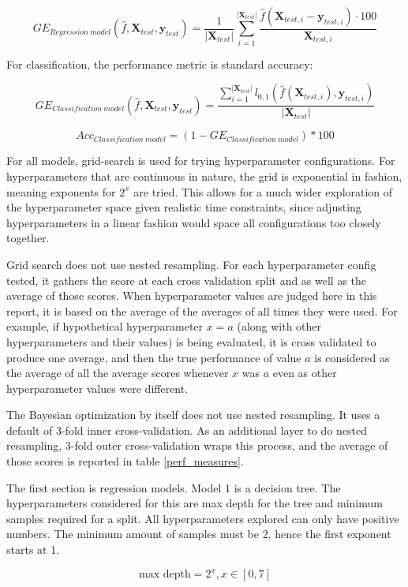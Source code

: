 \documentclass[12pt, letterpaper]{article}
\begin{document}
$$
    GE_{Regression\ model}(\hat{f}, \bm{X}_{test}, \bm{y}_{test}) = \frac{1}{|\bm{X}_{test}|} \sum_{i=1}^{|\bm{X}_{test}|} \frac{\hat{f}(\bm{X}_{test,i} - \bm{y}_{test,i}) \cdot 100}{\bm{X}_{test,i}}
$$

For classification, the performance metric is standard accuracy:

$$
    GE_{Classification\ model}(\hat{f}, \bm{X}_{test}, \bm{y}_{test}) = \frac{\sum_{i=1}^{|\bm{X}_{test}|}l_{0,1}(\hat{f}(\bm{X}_{test,i}), \bm{y}_{test,i})}{|\bm{X}_{test}|}
$$

$$
Acc_{Classification\ model} = (1 - GE_{Classification\ model}) * 100
$$

For all models, grid-search is used for trying hyperparameter configurations. For hyperparameters that are continuous in nature, the grid is exponential in fashion, meaning exponents for $2^x$ are tried. This allows for a much wider exploration of the hyperparameter space given realistic time constraints, since adjusting hyperparameters in a linear fashion would space all configurations too closely together.

Grid search does not use nested resampling. For each hyperparameter config tested, it gathers the score at each cross validation split and as well as the average of those scores. When hyperparameter values are judged here in this report, it is based on the average of the averages of all times they were used. For example, if hypothetical hyperparameter $x = a$ (along with other hyperparameters and their values) is being evaluated, it is cross validated to produce one average, and then the true performance of value $a$ is considered as the average of all the average scores whenever $x$ was $a$ even as other hyperparameter values were different.

The Bayesian optimization by itself does not use nested resampling. It uses a default of 3-fold inner cross-validation. As an additional layer to do nested resampling, 3-fold outer cross-validation wraps this process, and the average of those scores is reported in table \ref{perf_measures}.

The first section is regression models. Model 1 is a decision tree. The hyperparameters considered for this are max depth for the tree and minimum samples required for a split. All hyperparameters explored can only have positive numbers. The minimum amount of samples must be 2, hence the first exponent starts at 1.

$$
\text{max depth} = 2^x, x \in [0,7]
$$
\end{document}

